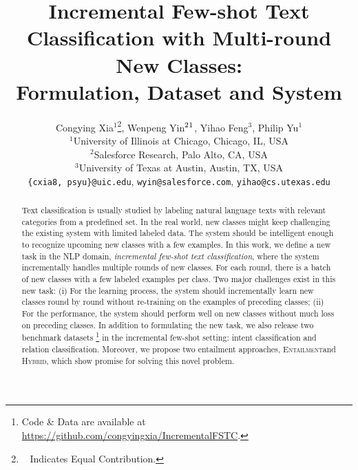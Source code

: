\documentclass[11pt]{article}
\title{Incremental Few-shot Text Classification with Multi-round New Classes:\\Formulation, Dataset and System}
\author{Congying Xia$^{1}$\thanks{~ Indicates Equal Contribution.}, Wenpeng Yin${^2\footnotemark[1]}$, Yihao Feng$^{3}$, Philip Yu$^{1}$\\
{$^1$University of Illinois at Chicago, Chicago, IL, USA} \\
{$^2$Salesforce Research, Palo Alto, CA, USA} \\
{$^3$University of Texas at Austin, Austin, TX, USA} \\
 {\tt \{cxia8, psyu\}@uic.edu},
 {\tt wyin@salesforce.com},
 {\tt yihao@cs.utexas.edu}
 }
\newcommand{\modelname}{\textsc{Entailment}}
\newcommand{\hybrid}{\textsc{Hybrid}}
\begin{document}
\maketitle
\begin{abstract}

Text classification is usually studied by labeling natural language texts with relevant categories from a predefined set. In the real world, new classes might keep challenging the existing system with limited labeled data. The system should be intelligent enough to recognize upcoming new classes with a few examples. In this work, we define a new task in the NLP domain, \textit{incremental few-shot text classification}, where the system incrementally handles multiple rounds of new classes. For each round, there is a batch of new classes with a few labeled examples per class. Two major challenges exist in this new task: (i) For the learning process, the system should incrementally learn new classes round by round without re-training on the examples of preceding classes; (ii) For the performance, the system should perform well on new classes without much loss on preceding classes. In addition to formulating the new task, we also release two benchmark datasets \footnote{Code \& Data are available at \url{https://github.com/congyingxia/IncrementalFSTC}.} 
in the incremental few-shot setting: intent classification and relation classification. Moreover, we propose two entailment approaches, \modelname\enspace and \hybrid, which show promise for solving this novel problem.
\end{abstract}
\end{document}
